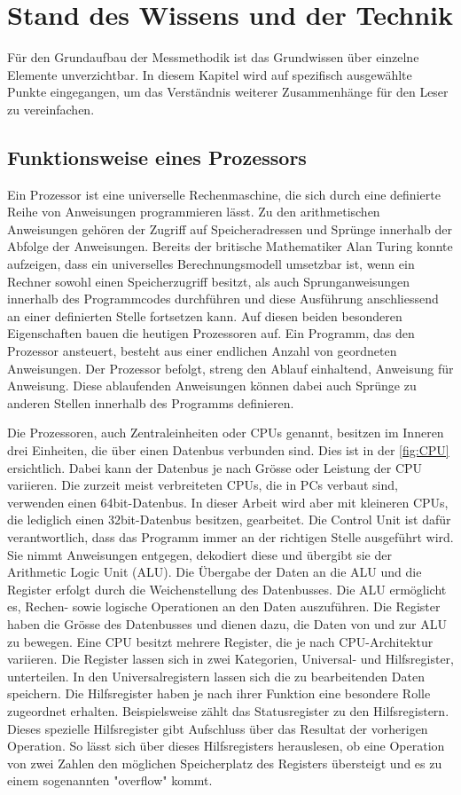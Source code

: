 \chapter{Stand des Wissens und der Technik}
Für den Grundaufbau der Messmethodik ist das Grundwissen über einzelne Elemente unverzichtbar. In diesem Kapitel wird auf spezifisch ausgewählte Punkte eingegangen, um das Verständnis weiterer Zusammenhänge für den Leser zu vereinfachen.


\section{Funktionsweise eines Prozessors}

Ein Prozessor ist eine universelle Rechenmaschine, die sich durch eine definierte Reihe von Anweisungen programmieren lässt. Zu den arithmetischen Anweisungen gehören der Zugriff auf Speicheradressen und Sprünge innerhalb der Abfolge der Anweisungen.
Bereits der britische Mathematiker Alan Turing konnte aufzeigen, dass ein universelles Berechnungsmodell umsetzbar ist, wenn ein Rechner sowohl einen Speicherzugriff besitzt, als auch Sprunganweisungen innerhalb des Programmcodes durchführen und diese Ausführung anschliessend an einer definierten Stelle fortsetzen kann\cite{Hoffmann2014l}. Auf diesen beiden besonderen Eigenschaften bauen die heutigen Prozessoren auf. Ein Programm, das den Prozessor ansteuert, besteht aus einer endlichen Anzahl von geordneten Anweisungen. Der Prozessor befolgt, streng den Ablauf einhaltend, Anweisung für Anweisung. Diese ablaufenden Anweisungen können dabei auch Sprünge zu anderen Stellen innerhalb des Programms definieren.
\par
Die Prozessoren, auch Zentraleinheiten oder CPUs genannt, besitzen im Inneren drei Einheiten, die über einen Datenbus verbunden sind. Dies ist in der \autoref{fig:CPU} ersichtlich. Dabei kann der Datenbus je nach Grösse oder Leistung der CPU variieren. Die zurzeit meist verbreiteten CPUs, die in PCs verbaut sind, verwenden einen 64bit-Datenbus. In dieser Arbeit wird aber mit kleineren CPUs, die lediglich einen 32bit-Datenbus besitzen, gearbeitet. Die Control Unit\cite{patterson2013computer} ist dafür verantwortlich, dass das Programm immer an der richtigen Stelle ausgeführt wird. Sie nimmt Anweisungen entgegen, dekodiert diese und übergibt sie der Arithmetic Logic Unit (ALU). Die Übergabe der Daten an die ALU und die Register erfolgt durch die Weichenstellung des Datenbusses. Die ALU ermöglicht es, Rechen- sowie logische Operationen an den Daten auszuführen. Die Register haben die Grösse des Datenbusses und dienen dazu, die Daten von und zur ALU zu bewegen. Eine CPU besitzt mehrere Register, die je nach CPU-Architektur variieren. Die Register lassen sich in zwei Kategorien, Universal- und Hilfsregister, unterteilen. In den Universalregistern lassen sich die zu bearbeitenden Daten speichern. Die Hilfsregister haben je nach ihrer Funktion eine besondere Rolle zugeordnet erhalten. Beispielsweise zählt das Statusregister zu den Hilfsregistern. Dieses spezielle Hilfsregister gibt Aufschluss über das Resultat der vorherigen Operation. So lässt sich über dieses Hilfsregisters herauslesen, ob eine Operation von zwei Zahlen den möglichen Speicherplatz des Registers übersteigt und es zu einem sogenannten "overflow" kommt.
